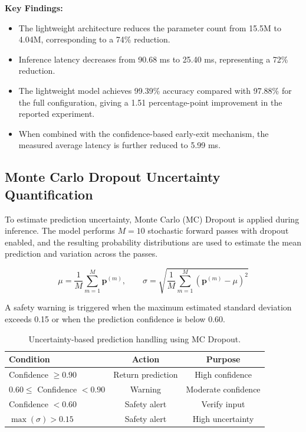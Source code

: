\documentclass[journal]{IEEEtran}
\begin{document}
\textbf{Key Findings:}

\begin{itemize}[leftmargin=1.2em]
    \item The lightweight architecture reduces the parameter count from 15.5M to 4.04M, corresponding to a 74\% reduction.

    \item Inference latency decreases from 90.68 ms to 25.40 ms, representing a 72\% reduction.

    \item The lightweight model achieves 99.39\% accuracy compared with 97.88\% for the full configuration, giving a 1.51 percentage-point improvement in the reported experiment.

    \item When combined with the confidence-based early-exit mechanism, the measured average latency is further reduced to 5.99 ms.
\end{itemize}


\subsection{Monte Carlo Dropout Uncertainty Quantification}

To estimate prediction uncertainty, Monte Carlo (MC) Dropout is applied during inference. The model performs $M=10$ stochastic forward passes with dropout enabled, and the resulting probability distributions are used to estimate the mean prediction and variation across the passes.

\begin{equation}
\mu = \frac{1}{M}\sum_{m=1}^{M}\mathbf{p}^{(m)},
\qquad
\sigma =
\sqrt{
\frac{1}{M}
\sum_{m=1}^{M}
\left(\mathbf{p}^{(m)}-\mu\right)^2
}
\end{equation}

A safety warning is triggered when the maximum estimated standard deviation exceeds 0.15 or when the prediction confidence is below 0.60.

\begin{table}[t]
\centering
\caption{Uncertainty-based prediction handling using MC Dropout.}
\label{tab:uncertainty}
\begin{tabular}{lcc}
\hline
\textbf{Condition} & \textbf{Action} & \textbf{Purpose} \\
\hline
Confidence $\geq 0.90$ & Return prediction & High confidence \\
$0.60 \leq$ Confidence $<0.90$ & Warning & Moderate confidence \\
Confidence $<0.60$ & Safety alert & Verify input \\
$\max(\sigma)>0.15$ & Safety alert & High uncertainty \\
\hline
\end{tabular}
\end{table}
\end{document}
